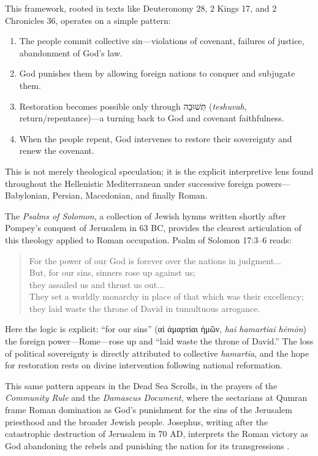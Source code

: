 This framework, rooted in texts like Deuteronomy 28, 2 Kings 17, and 2 Chronicles 36, operates on a simple pattern:
\begin{enumerate}
    \item The people commit collective sin---violations of covenant, failures of justice, abandonment of God's law.
    \item God punishes them by allowing foreign nations to conquer and subjugate them.
    \item Restoration becomes possible only through \texthebrew{תְּשׁוּבָה} (\textit{teshuvah}, return/repentance)---a turning back to God and covenant faithfulness.
    \item When the people repent, God intervenes to restore their sovereignty and renew the covenant.
\end{enumerate}

This is not merely theological speculation; it is the explicit interpretive lens found throughout the Hellenistic Mediterranean under successive foreign powers---Babylonian, Persian, Macedonian, and finally Roman.

The \textit{Psalms of Solomon}, a collection of Jewish hymns written shortly after Pompey's conquest of Jerusalem in 63 BC, provides the clearest articulation of this theology applied to Roman occupation.
Psalm of Solomon 17:3--6 reads:

\begin{quote}
For the power of our God is forever over the nations in judgment... \\
But, for our sins, sinners rose up against us; \\
they assailed us and thrust us out... \\
They set a worldly monarchy in place of that which was their excellency; \\
they laid waste the throne of David in tumultuous arrogance.
\end{quote}

Here the logic is explicit: ``for our sins'' (αἱ ἁμαρτίαι ἡμῶν, \textit{hai hamartiai hēmōn}) the foreign power---Rome---rose up and ``laid waste the throne of David.''
The loss of political sovereignty is directly attributed to collective \textit{hamartia}, and the hope for restoration rests on divine intervention following national reformation.

This same pattern appears in the Dead Sea Scrolls, in the prayers of the \textit{Community Rule} and the \textit{Damascus Document}, where the sectarians at Qumran frame Roman domination as God's punishment for the sins of the Jerusalem priesthood and the broader Jewish people.
Josephus, writing after the catastrophic destruction of Jerusalem in 70 AD, interprets the Roman victory as God abandoning the rebels and punishing the nation for its transgressions \cite[5.19]{josephus:war}.

